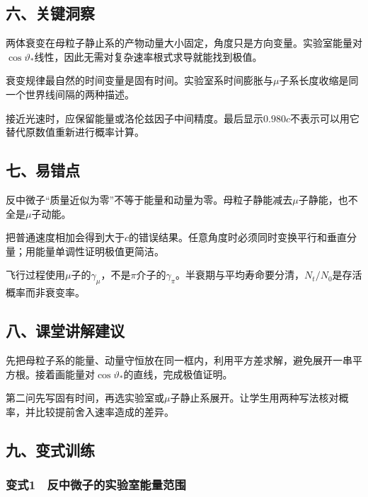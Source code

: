 \documentclass[12pt,a4paper,fontset=fandol]{ctexart}
\begin{document}
\subsection{六、关键洞察}\label{ux516dux5173ux952eux6d1eux5bdf-5}

两体衰变在母粒子静止系的产物动量大小固定，角度只是方向变量。实验室能量对\(\cos\vartheta_*\)线性，因此无需对复杂速率根式求导就能找到极值。

衰变规律最自然的时间变量是固有时间。实验室系时间膨胀与\(\mu\)子系长度收缩是同一个世界线间隔的两种描述。

接近光速时，应保留能量或洛伦兹因子中间精度。最后显示\(0.980c\)不表示可以用它替代原数值重新进行概率计算。

\subsection{七、易错点}\label{ux4e03ux6613ux9519ux70b9-5}

反中微子``质量近似为零''不等于能量和动量为零。母粒子静能减去\(\mu\)子静能，也不全是\(\mu\)子动能。

把普通速度相加会得到大于\(c\)的错误结果。任意角度时必须同时变换平行和垂直分量；用能量单调性证明极值更简洁。

飞行过程使用\(\mu\)子的\(\gamma_\mu\)，不是\(\pi\)介子的\(\gamma_\pi\)。半衰期与平均寿命要分清，\(N_t/N_0\)是存活概率而非衰变率。

\subsection{八、课堂讲解建议}\label{ux516bux8bfeux5802ux8bb2ux89e3ux5efaux8bae-5}

先把母粒子系的能量、动量守恒放在同一框内，利用平方差求解，避免展开一串平方根。接着画能量对\(\cos\vartheta_*\)的直线，完成极值证明。

第二问先写固有时间，再选实验室或\(\mu\)子静止系展开。让学生用两种写法核对概率，并比较提前舍入速率造成的差异。

\subsection{九、变式训练}\label{ux4e5dux53d8ux5f0fux8badux7ec3-5}

\subsubsection{变式1　反中微子的实验室能量范围}\label{ux53d8ux5f0f1-ux53cdux4e2dux5faeux5b50ux7684ux5b9eux9a8cux5ba4ux80fdux91cfux8303ux56f4}
\end{document}

